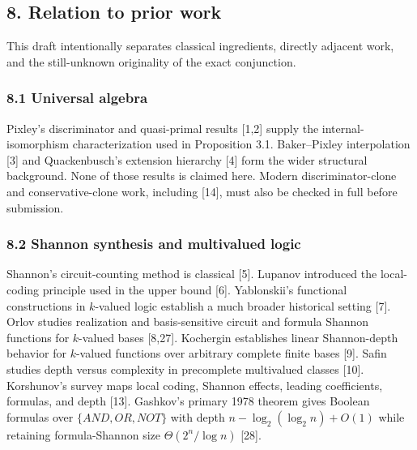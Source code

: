 \documentclass[
  11pt,
]{article}
\theoremstyle{definition}
\theoremstyle{remark}
\begin{document}
\hypertarget{relation-to-prior-work}{%
\subsection{8. Relation to prior work}\label{relation-to-prior-work}}

This draft intentionally separates classical ingredients, directly
adjacent work, and the still-unknown originality of the exact
conjunction.

\hypertarget{universal-algebra}{%
\subsubsection{8.1 Universal algebra}\label{universal-algebra}}

Pixley's discriminator and quasi-primal results {[}1,2{]} supply the
internal-isomorphism characterization used in Proposition 3.1.
Baker--Pixley interpolation {[}3{]} and Quackenbusch's extension
hierarchy {[}4{]} form the wider structural background. None of those
results is claimed here. Modern discriminator-clone and
conservative-clone work, including {[}14{]}, must also be checked in
full before submission.

\hypertarget{shannon-synthesis-and-multivalued-logic}{%
\subsubsection{8.2 Shannon synthesis and multivalued
logic}\label{shannon-synthesis-and-multivalued-logic}}

Shannon's circuit-counting method is classical {[}5{]}. Lupanov
introduced the local-coding principle used in the upper bound {[}6{]}.
Yablonskii's functional constructions in \(k\)-valued logic establish a
much broader historical setting {[}7{]}. Orlov studies realization and
basis-sensitive circuit and formula Shannon functions for \(k\)-valued
bases {[}8,27{]}. Kochergin establishes linear Shannon-depth behavior
for \(k\)-valued functions over arbitrary complete finite bases {[}9{]}.
Safin studies depth versus complexity in precomplete multivalued classes
{[}10{]}. Korshunov's survey maps local coding, Shannon effects, leading
coefficients, formulas, and depth {[}13{]}. Gashkov's primary 1978
theorem gives Boolean formulas over \(\{AND,OR,NOT\}\) with depth
\(n-\log_2(\log_2 n)+O(1)\) while retaining formula-Shannon size
\(\Theta(2^n/\log n)\) {[}28{]}.
\end{document}
